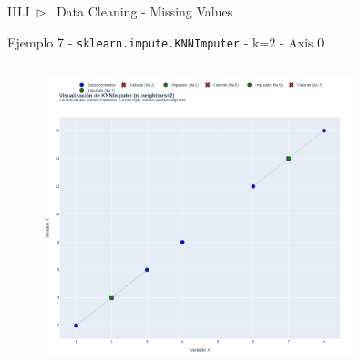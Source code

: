 \documentclass[xcolor=dvipsnames]{beamer}
\begin{document}
    \begin{frame}[fragile]{III.I~$\rhd$~ Data Cleaning - Missing Values}
        \begin{exampleblock}{Ejemplo 7 - \texttt{sklearn.impute.KNNImputer} - k=2 - Axis 0}
        \begin{columns}
                \begin{figure}
                \centering
                \includegraphics[width=0.8\textwidth]{imgs/imp/ej1.png}
                \end{figure}
                
        \end{columns}
        \end{exampleblock}
    \end{frame}
\end{document}
